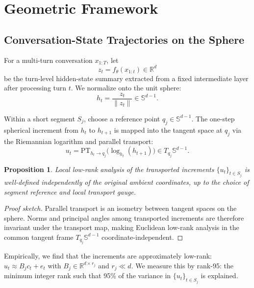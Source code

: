 \documentclass[conference]{IEEEtran}
\newtheorem{proposition}{Proposition}
\newcommand{\R}{\mathbb{R}}
\newcommand{\Sph}{\mathbb{S}}
\begin{document}
\section{Geometric Framework}
\label{sec:math}

\subsection{Conversation-State Trajectories on the Sphere}

For a multi-turn conversation $x_{1:T}$, let
\begin{equation}
z_t = f_\theta(x_{1:t}) \in \R^d
\end{equation}
be the turn-level hidden-state summary extracted from a fixed intermediate
layer after processing turn $t$. We normalize onto the unit sphere:
\begin{equation}
h_t = \frac{z_t}{\lVert z_t \rVert} \in \Sph^{d-1}.
\end{equation}

Within a short segment $S_j$, choose a reference point $q_j \in \Sph^{d-1}$.
The one-step spherical increment from $h_t$ to $h_{t+1}$ is mapped into the
tangent space at $q_j$ via the Riemannian logarithm and parallel transport:
\begin{equation}
u_t = \mathrm{PT}_{h_t \rightarrow q_j}\!\bigl(\log_{h_t}(h_{t+1})\bigr)
\in T_{q_j}\Sph^{d-1}.
\label{eq:transported}
\end{equation}

\begin{proposition}
Local low-rank analysis of the transported increments $\{u_t\}_{t \in S_j}$
is well-defined independently of the original ambient coordinates, up to the
choice of segment reference and local transport gauge.
\end{proposition}
\begin{proof}[Proof sketch]
Parallel transport is an isometry between tangent spaces on the sphere.
Norms and principal angles among transported increments are therefore
invariant under the transport map, making Euclidean low-rank analysis
in the common tangent frame $T_{q_j}\Sph^{d-1}$ coordinate-independent.
\end{proof}

Empirically, we find that the increments are approximately low-rank:
$u_t \approx B_j c_t + e_t$ with $B_j \in \R^{d \times r_j}$ and
$r_j \ll d$. We measure this by rank-95: the minimum integer rank such
that 95\% of the variance in $\{u_t\}_{t \in S_j}$ is explained.
\end{document}
